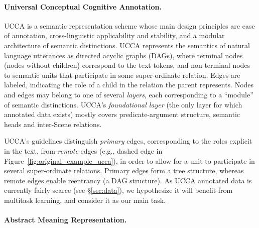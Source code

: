 \documentclass[11pt,a4paper]{article}
\newcommand{\oa}[1]{\footnote{\color{red}OA: #1}}
\begin{document}

\paragraph{Universal Conceptual Cognitive Annotation.}\label{sec:ucca}
UCCA \cite{abend2013universal} is a semantic representation scheme whose main design principles
are ease of annotation, cross-linguistic applicability and stability, and a modular architecture of semantic distinctions.
UCCA represents the semantics of natural language utterances
as directed acyclic graphs (DAGs), where terminal nodes (nodes without children)
correspond to the text tokens, and non-terminal nodes to semantic units that participate
in some super-ordinate relation.
Edges are labeled, indicating the role of a child in the relation the parent represents.
Nodes and edges may belong to one of several \textit{layers}, each corresponding
to a ``module'' of semantic distinctions.
UCCA's \textit{foundational layer} (the only layer for which annotated data exists) 
mostly covers predicate-argument structure, semantic heads and inter-Scene relations.

UCCA's guidelines distinguish \textit{primary} edges, corresponding 
to the roles explicit in the text, from \textit{remote} edges (e.g., dashed edge in
Figure~\ref{fig:original_example_ucca}), in order to allow for a unit to participate
in several super-ordinate relations.
Primary edges form a tree structure,
whereas remote edges enable reentrancy (a DAG structure).
As UCCA annotated data is currently fairly scarce (see \S\ref{sec:data}), 
we hypothesize it will benefit from multitask learning, and consider it as our
main task.

\paragraph{Abstract Meaning Representation.}\label{sec:amr}
\end{document}
